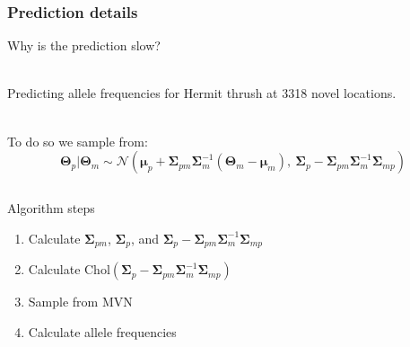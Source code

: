 \documentclass[t]{beamer}\usepackage[]{graphicx}\usepackage[]{color}
\begin{document}
\begin{frame}
\frametitle{Prediction details}

Why is the prediction slow? \pause 

~\\

Predicting allele frequencies for Hermit thrush at 3318 novel locations.\\ \pause

~\\

To do so we sample from:
\[ \bm{\Theta}_p | \bm{\Theta}_m \sim \mathcal{N}(\bm{\mu}_p+\bm\Sigma_{pm}\bm\Sigma_{m}^{-1}(\bm{\Theta}_m-\bm\mu_m),\: \bm\Sigma_{p}-\bm\Sigma_{pm}\bm\Sigma_{m}^{-1}\bm\Sigma_{mp}) \]

\pause

\vspace{-3mm}

\begin{columns}
\begin{block}{Algorithm steps}
\begin{enumerate}
\item Calculate $\bm\Sigma_{pm}$, $\bm\Sigma_{p}$, and $\bm\Sigma_{p}-\bm\Sigma_{pm}\bm\Sigma_{m}^{-1}\bm\Sigma_{mp}$
\item Calculate $\text{Chol}(\bm\Sigma_{p}-\bm\Sigma_{pm}\bm\Sigma_{m}^{-1}\bm\Sigma_{mp})$
\item Sample from MVN
\item Calculate allele frequencies
\end{enumerate}
\end{block}
\end{columns}
\end{frame}

\end{document}
